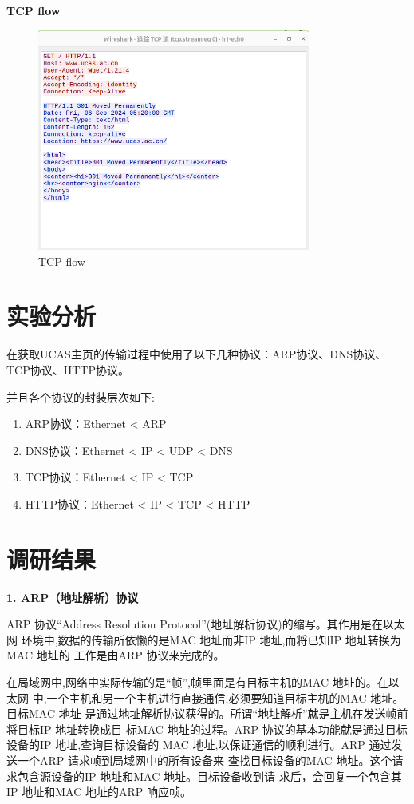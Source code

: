 \documentclass[11pt]{article}
\begin{document}
\textbf{TCP flow}
\begin{figure}[htbp]
  \centering
  \includegraphics[width=0.8\textwidth]{fig/tcp_flow.png}
  \caption{TCP flow}
  \label{fig:TCP flow}
\end{figure}

\section{实验分析}

在获取UCAS主页的传输过程中使用了以下几种协议：ARP协议、DNS协议、TCP协议、HTTP协议。

并且各个协议的封装层次如下:

\begin{enumerate}
  \item ARP协议：Ethernet < ARP
  \item DNS协议：Ethernet < IP < UDP < DNS
  \item TCP协议：Ethernet < IP < TCP
  \item HTTP协议：Ethernet < IP < TCP < HTTP
\end{enumerate}

\section{调研结果}

\textbf{1. ARP（地址解析）协议}

ARP 协议“Address Resolution Protocol”(地址解析协议)的缩写。其作用是在以太网
环境中,数据的传输所依懒的是MAC 地址而非IP 地址,而将已知IP 地址转换为MAC 地址的
工作是由ARP 协议来完成的。

在局域网中,网络中实际传输的是“帧”,帧里面是有目标主机的MAC 地址的。在以太网
中,一个主机和另一个主机进行直接通信,必须要知道目标主机的MAC 地址。目标MAC 地址
是通过地址解析协议获得的。所谓“地址解析”就是主机在发送帧前将目标IP 地址转换成目
标MAC 地址的过程。ARP 协议的基本功能就是通过目标设备的IP 地址,查询目标设备的
MAC 地址,以保证通信的顺利进行。ARP 通过发送一个ARP 请求帧到局域网中的所有设备来
查找目标设备的MAC 地址。这个请求包含源设备的IP 地址和MAC 地址。目标设备收到请
求后，会回复一个包含其IP 地址和MAC 地址的ARP 响应帧。
\end{document}
